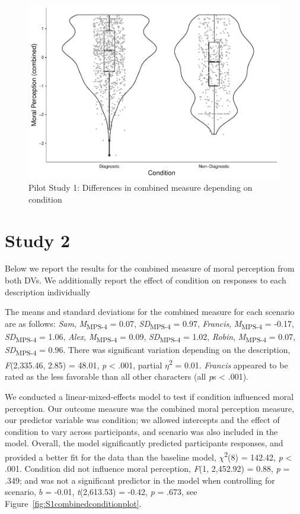 \documentclass[
  american,
  man,floatsintext]{apa7}
\begin{document}
\begin{figure}[!p]
\includegraphics{Supplementary_files/figure-latex/pilot2cobminedconditionplot-1} \caption{Pilot Study 1: Differences in combined measure depending on condition}\label{fig:pilot2cobminedconditionplot}
\end{figure}

\newpage

\hypertarget{study-2}{%
\section{Study 2}\label{study-2}}

Below we report the results for the combined measure of moral perception from both DVs. We additionally report the effect of condition on responses to each description individually

The means and standard deviations for the combined measure for each scenario are as follows:
\emph{Sam},
\emph{M}\textsubscript{MPS-4} = 0.07, \emph{SD}\textsubscript{MPS-4} = 0.97,
\emph{Francis},
\emph{M}\textsubscript{MPS-4} = -0.17, \emph{SD}\textsubscript{MPS-4} = 1.06,
\emph{Alex},
\emph{M}\textsubscript{MPS-4} = 0.09, \emph{SD}\textsubscript{MPS-4} = 1.02,
\emph{Robin},
\emph{M}\textsubscript{MPS-4} = 0.07, \emph{SD}\textsubscript{MPS-4} = 0.96. There was significant variation depending on the description, \emph{F}(2,335.46, 2.85) = 48.01, \emph{p} \textless{} .001, partial \(\eta\)\textsuperscript{2} = 0.01. \emph{Francis} appeared to be rated as the less favorable than all other characters (all \emph{p}s \textless{} .001).

We conducted a linear-mixed-effects model to test if condition influenced moral perception. Our outcome measure was the combined moral perception measure, our predictor variable was condition; we allowed intercepts and the effect of condition to vary across participants, and scenario was also included in the model.
Overall, the model significantly predicted participants responses, and provided a better fit for the data than the baseline model, \(\chi\)\textsuperscript{2}(8) = 142.42, \emph{p} \textless{} .001. Condition did not influence moral perception, \emph{F}(1, 2,452.92) = 0.88, \emph{p} = .349; and was not a significant predictor in the model when controlling for scenario, \(b\) = -0.01, \emph{t}(2,613.53) = -0.42, \emph{p} = .673, see Figure~\ref{fig:S1combinedconditionplot}.
\end{document}
